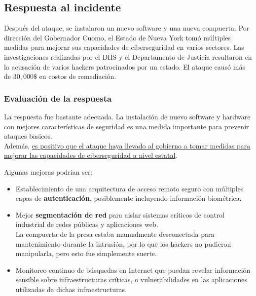 \subsection{Respuesta al incidente}
Después del ataque, se instalaron un nuevo software y una nueva compuerta. Por dirección del Gobernador Cuomo, el Estado de Nueva York tomó múltiples medidas para mejorar sus capacidades de ciberseguridad en varios sectores. Las investigaciones realizadas por el DHS y el Departamento de Justicia resultaron en la acusación de varios hackers patrocinados por un estado. El ataque causó más de $30,000\$$ en costos de remediación.

\subsubsection{Evaluación de la respuesta}
La respuesta fue bastante adecuada.
La instalación de nuevo software y hardware con mejores características de seguridad es una medida importante para prevenir ataques basicos.\\
Además, \ul{es positivo que el ataque haya llevado al gobierno a tomar medidas para mejorar las capacidades de ciberseguridad a nivel estatal}.



Algunas mejoras podrían ser:
\begin{itemize}
    \item Establecimiento de una arquitectura de acceso remoto seguro con múltiples capas de \textbf{autenticación}, posiblemente incluyendo información biométrica.
    \item Mejor \textbf{segmentación de red} para aislar sistemas críticos de control industrial de redes públicas y aplicaciones web.\\
    La compuerta de la presa estaba manualmente desconectada para mantenimiento durante la intrusión, por lo que los hackers no pudieron manipularla, pero esto fue simplemente suerte.
    \item Monitoreo continuo de búsquedas en Internet que puedan revelar información sensible sobre infraestructuras críticas, o vulnerabilidades en las aplicaciones utilizadas da dichas infraestructuras.
\end{itemize}

